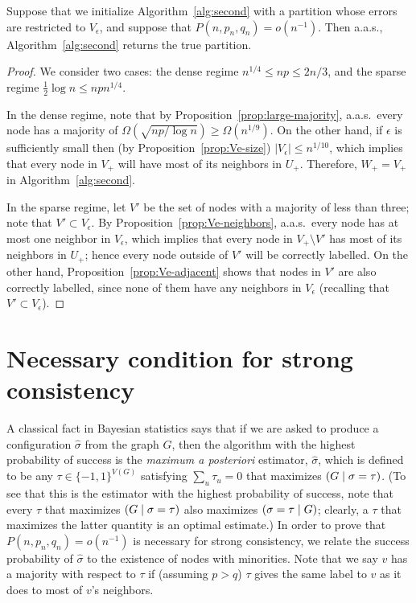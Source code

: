 \documentclass[EJP,final]{ejpecp}
\newcommand{\1}[1]{\mathbbm{1}_{\{#1\}}}
\let\Pr\relax
\DeclareMathOperator{\Pr}{Pr}
\begin{document}
\begin{proposition}\label{prop:alg-works}
 Suppose that we initialize Algorithm~\ref{alg:second} with a partition whose
 errors are restricted to $V_\epsilon$, and suppose that $P(n, p_n, q_n) = o(n^{-1})$.
 Then a.a.s., Algorithm~\ref{alg:second} returns the true partition.
\end{proposition}

\begin{proof}
  We consider two cases: the dense regime $n^{1/4} \le np \le 2n/3$, and the sparse
 regime $\frac 12 \log n \le np n^{1/4}$.

 In the dense regime, note that by Proposition~\ref{prop:large-majority},
 a.a.s.\ every node has a majority of $\Omega(\sqrt{np/\log n}) \ge \Omega(n^{1/9})$.
 On the other hand, if $\epsilon$ is sufficiently small then
 (by Proposition~\ref{prop:Ve-size}) $|V_\epsilon| \le n^{1/10}$, which implies that
 every node in $V_+$ will have most of its neighbors in $U_+$.
 Therefore, $W_+ = V_+$ in Algorithm~\ref{alg:second}.

 In the sparse regime, let $V'$ be the set
 of nodes with a majority of less than three; note that $V' \subset V_\epsilon$.
 By Proposition~\ref{prop:Ve-neighbors},
 a.a.s.\ every node has at most one neighbor in $V_\epsilon$, which
 implies that every node in $V_+ \setminus V'$ has most of its neighbors in $U_+$;
 hence every node outside of $V'$ will be correctly labelled.
 On the other hand,
 Proposition~\ref{prop:Ve-adjacent} shows that nodes in $V'$ are also correctly
 labelled, since none of them have any neighbors in $V_\epsilon$ (recalling
 that $V' \subset V_\epsilon$).
\end{proof}

\section{Necessary condition for strong consistency}

\label{sec:necessary-strong}

A classical fact in Bayesian statistics says that if we are asked to produce
a configuration $\hat \sigma$ from the graph $G$, then the algorithm
with the highest probability of success is the \emph{maximum
a posteriori} estimator, $\hat \sigma$, which is defined to be
any $\tau \in \{-1, 1\}^{V(G)}$ satisfying $\sum_u \tau_u = 0$
that maximizes $\Pr(G \mid \sigma = \tau)$.
(To see that this is the estimator with the highest probability of success,
note that every $\tau$ that maximizes $\Pr(G \mid \sigma = \tau)$ 
also maximizes $\Pr(\sigma = \tau \mid G)$; clearly, a $\tau$ that
maximizes the latter quantity is an optimal estimate.)
In order to prove that $P(n, p_n, q_n) = o(n^{-1})$ is necessary for
strong consistency, we relate the success probability of
$\hat \sigma$ to the existence of nodes with minorities.
Note that we say $v$ has a majority with respect to
$\tau$ if (assuming $p > q$) $\tau$ gives the same label to $v$ as
it does to most of $v$'s neighbors.
\end{document}
